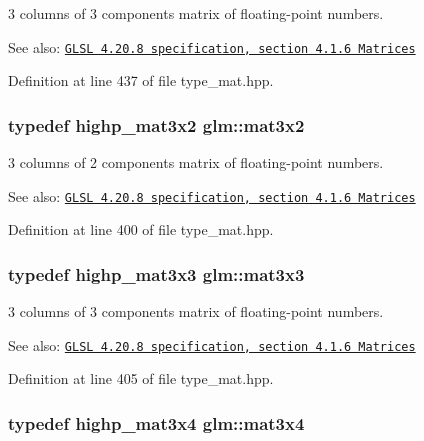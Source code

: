 3 columns of 3 components matrix of floating-point numbers.

\begin{Desc}
\item[See also:]\href{http://www.opengl.org/registry/doc/GLSLangSpec.4.20.8.pdf}{\tt GLSL 4.20.8 specification, section 4.1.6 Matrices} \end{Desc}


Definition at line 437 of file type\_\-mat.hpp.\hypertarget{group__core__types_gd7476e0e866186f12ee87975c6b01552}{
\subsubsection[mat3x2]{\setlength{\rightskip}{0pt plus 5cm}typedef highp\_\-mat3x2 {\bf glm::mat3x2}}}
\label{group__core__types_gd7476e0e866186f12ee87975c6b01552}


3 columns of 2 components matrix of floating-point numbers.

\begin{Desc}
\item[See also:]\href{http://www.opengl.org/registry/doc/GLSLangSpec.4.20.8.pdf}{\tt GLSL 4.20.8 specification, section 4.1.6 Matrices} \end{Desc}


Definition at line 400 of file type\_\-mat.hpp.\hypertarget{group__core__types_g6fecca6a869070b6bf8acb44ce1c2af3}{
\subsubsection[mat3x3]{\setlength{\rightskip}{0pt plus 5cm}typedef highp\_\-mat3x3 {\bf glm::mat3x3}}}
\label{group__core__types_g6fecca6a869070b6bf8acb44ce1c2af3}


3 columns of 3 components matrix of floating-point numbers.

\begin{Desc}
\item[See also:]\href{http://www.opengl.org/registry/doc/GLSLangSpec.4.20.8.pdf}{\tt GLSL 4.20.8 specification, section 4.1.6 Matrices} \end{Desc}


Definition at line 405 of file type\_\-mat.hpp.\hypertarget{group__core__types_g5524ae15d7fc00a68b8e0e3a0733cc2a}{
\subsubsection[mat3x4]{\setlength{\rightskip}{0pt plus 5cm}typedef highp\_\-mat3x4 {\bf glm::mat3x4}}}
\label{group__core__types_g5524ae15d7fc00a68b8e0e3a0733cc2a}


